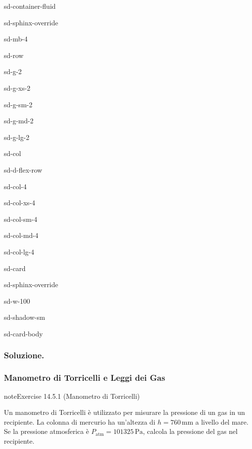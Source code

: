 \documentclass[letterpaper,10pt,italian]{jupyterBook}
\begin{document}
\begin{sphinxuseclass}{sd-container-fluid}
\begin{sphinxuseclass}{sd-sphinx-override}
\begin{sphinxuseclass}{sd-mb-4}
\begin{sphinxuseclass}{sd-row}
\begin{sphinxuseclass}{sd-g-2}
\begin{sphinxuseclass}{sd-g-xs-2}
\begin{sphinxuseclass}{sd-g-sm-2}
\begin{sphinxuseclass}{sd-g-md-2}
\begin{sphinxuseclass}{sd-g-lg-2}
\begin{sphinxuseclass}{sd-col}
\begin{sphinxuseclass}{sd-d-flex-row}
\begin{sphinxuseclass}{sd-col-4}
\begin{sphinxuseclass}{sd-col-xs-4}
\begin{sphinxuseclass}{sd-col-sm-4}
\begin{sphinxuseclass}{sd-col-md-4}
\begin{sphinxuseclass}{sd-col-lg-4}
\begin{sphinxuseclass}{sd-card}
\begin{sphinxuseclass}{sd-sphinx-override}
\begin{sphinxuseclass}{sd-w-100}
\begin{sphinxuseclass}{sd-shadow-sm}
\begin{sphinxuseclass}{sd-card-body}
\end{sphinxuseclass}
\end{sphinxuseclass}
\end{sphinxuseclass}
\end{sphinxuseclass}
\end{sphinxuseclass}
\end{sphinxuseclass}
\end{sphinxuseclass}
\end{sphinxuseclass}
\end{sphinxuseclass}
\end{sphinxuseclass}
\end{sphinxuseclass}
\end{sphinxuseclass}
\end{sphinxuseclass}
\end{sphinxuseclass}
\end{sphinxuseclass}
\end{sphinxuseclass}
\end{sphinxuseclass}
\end{sphinxuseclass}
\end{sphinxuseclass}
\end{sphinxuseclass}
\end{sphinxuseclass}\subsubsection*{Soluzione.}


\subsubsection{Manometro di Torricelli e Leggi dei Gas}
\label{\detokenize{ch/thermodynamics/foundation-problems:manometro-di-torricelli-e-leggi-dei-gas}} \label{exercise:ch/thermodynamics/foundation-problems-exercise-0}

\begin{sphinxadmonition}{note}{Exercise 14.5.1 (Manometro di Torricelli)}



\sphinxAtStartPar
Un manometro di Torricelli è utilizzato per misurare la pressione di un gas in un recipiente. La colonna di mercurio ha un’altezza di \(h = 760 \, \text{mm}\) a livello del mare. Se la pressione atmosferica è \(P_\text{atm} = 101325 \, \text{Pa}\), calcola la pressione del gas nel recipiente.
\end{sphinxadmonition}
 \label{exercise:ch/thermodynamics/foundation-problems-exercise-1}
\end{document}
